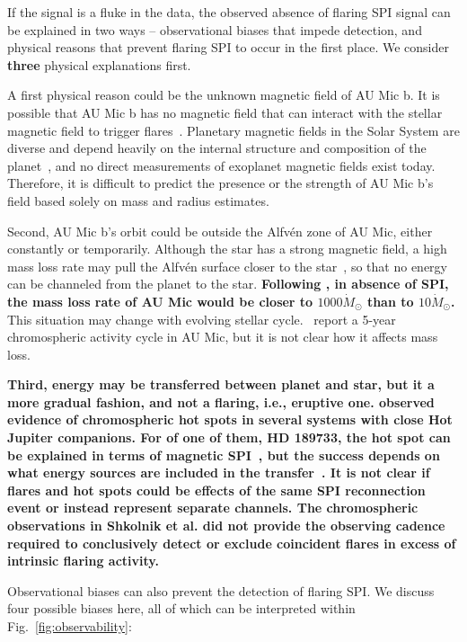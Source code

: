 \documentclass[fleqn,usenatbib]{mnras}%
\begin{document}
If the signal is a fluke in the data, the observed absence of flaring SPI signal can be explained in two ways -- observational biases that impede detection, and physical reasons that prevent flaring SPI to occur in the first place. We consider \textbf{three} physical explanations first.

A first physical reason could be the unknown magnetic field of AU Mic b. It is possible that AU Mic b has no magnetic field that can interact with the stellar magnetic field to trigger flares~\citep{lanza2018close-by}. Planetary magnetic fields in the Solar System are diverse and depend heavily on the internal structure and composition of the planet~\citep{stevenson2003planetary}, and no direct measurements of exoplanet magnetic fields exist today. Therefore, it is difficult to predict the presence or the strength of AU Mic b's field based solely on mass and radius estimates.

Second, AU Mic b's orbit could be outside the Alfv\'en zone of AU Mic, either constantly or temporarily. Although the star has a strong magnetic field, a high mass loss rate may pull the Alfv\'en surface closer to the star~\citep{kavanagh2021}, so that no energy can be channeled from the planet to the star. \textbf{Following \citet{kavanagh2021}, in absence of SPI, the mass loss rate of AU Mic would be closer to $1000\dot{M}_\odot$ than to $10\dot{M}_\odot$.} This situation may change with evolving stellar cycle.~\citet{ibanezbustos2019first} report a 5-year chromospheric activity cycle in AU Mic, but it is not clear how it affects mass loss.

\textbf{Third, energy may be transferred between planet and star, but it a more gradual fashion, and not a flaring, i.e., eruptive one. \cite{shkolnik2003evidence, shkolnik2005hot, shkolnik2008nature} observed evidence of chromospheric hot spots in several systems with close Hot Jupiter companions. For of one of them, HD 189733, the hot spot can be explained in terms of magnetic SPI~\citep{cohen2011dynamics}, but the success depends on what energy sources are included in the transfer~\citep{lanza2012starplanet}. It is not clear if flares and hot spots could be effects of the same SPI reconnection event or instead represent separate channels. The chromospheric observations in Shkolnik et al. did not provide the observing cadence required to conclusively detect or exclude coincident flares in excess of intrinsic flaring activity.}

Observational biases can also prevent the detection of flaring SPI. We discuss four possible biases here, all of which can be interpreted within Fig.~\ref{fig:observability}:
\end{document}
